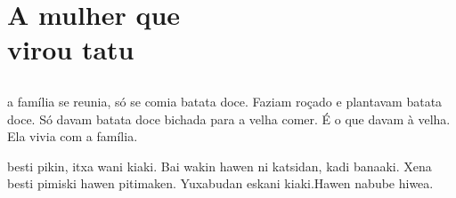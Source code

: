 \openany\raggedright

\blankpage
\part[A mulher que virou tatu]{A mulher que\\ virou tatu}

\chapter*{}

\mbox{}\vspace*{\fill}


\begingroup\setlength{\linewidth}{.6\linewidth}

 a família se reunia, só se comia
batata doce. Faziam roçado e plantavam
batata doce. Só davam batata doce bichada
para a velha comer. É o que davam à velha.
Ela vivia com a família.

\vspace{2em}


 besti pikin, itxa wani kiaki.
Bai wakin hawen ni katsidan, kadi banaaki.
Xena besti pimiski hawen pitimaken.
Yuxabudan eskani kiaki.Hawen
nabube hiwea.

\vspace*{\fill}

